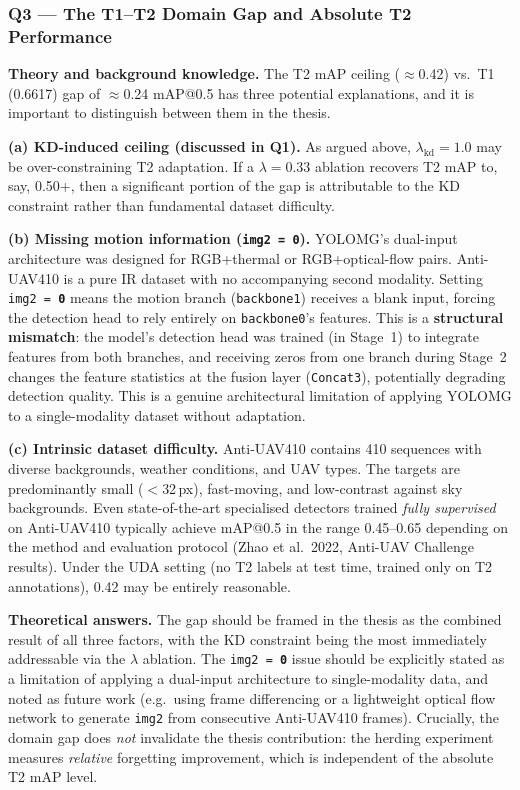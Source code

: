 \subsubsection*{Q3 — The T1--T2 Domain Gap and Absolute T2 Performance}

\textbf{Theory and background knowledge.}
The T2 mAP ceiling ($\approx$0.42) vs.\ T1 (0.6617) gap of
$\approx$0.24 mAP@0.5 has three potential explanations, and it
is important to distinguish between them in the thesis.

\textbf{(a) KD-induced ceiling (discussed in Q1).}
As argued above, $\lambda_{\text{kd}}=1.0$ may be over-constraining
T2 adaptation. If a $\lambda=0.33$ ablation recovers T2 mAP to,
say, 0.50+, then a significant portion of the gap is attributable
to the KD constraint rather than fundamental dataset difficulty.

\textbf{(b) Missing motion information (\texttt{img2\,=\,\textbf{0}}).}
YOLOMG's dual-input architecture was designed for RGB+thermal or
RGB+optical-flow pairs. Anti-UAV410 is a pure IR dataset with no
accompanying second modality. Setting \texttt{img2\,=\,\textbf{0}}
means the motion branch (\texttt{backbone1}) receives a blank input,
forcing the detection head to rely entirely on \texttt{backbone0}'s
features. This is a \textbf{structural mismatch}: the model's
detection head was trained (in Stage~1) to integrate features from
both branches, and receiving zeros from one branch during Stage~2
changes the feature statistics at the fusion layer
(\texttt{Concat3}), potentially degrading detection quality.
This is a genuine architectural limitation of applying YOLOMG to a
single-modality dataset without adaptation.

\textbf{(c) Intrinsic dataset difficulty.}
Anti-UAV410 contains 410 sequences with diverse backgrounds, weather
conditions, and UAV types. The targets are predominantly small
($<$32\,px), fast-moving, and low-contrast against sky backgrounds.
Even state-of-the-art specialised detectors trained \emph{fully
supervised} on Anti-UAV410 typically achieve mAP@0.5 in the range
0.45--0.65 depending on the method and evaluation protocol
(Zhao et al.\ 2022, Anti-UAV Challenge results). Under the UDA
setting (no T2 labels at test time, trained only on T2 annotations),
0.42 may be entirely reasonable.

\textbf{Theoretical answers.}
The gap should be framed in the thesis as the combined result of
all three factors, with the KD constraint being the most immediately
addressable via the $\lambda$ ablation. The \texttt{img2\,=\,\textbf{0}}
issue should be explicitly stated as a limitation of applying a
dual-input architecture to single-modality data, and noted as
future work (e.g.\ using frame differencing or a lightweight optical
flow network to generate \texttt{img2} from consecutive Anti-UAV410
frames). Crucially, the domain gap does \emph{not} invalidate the
thesis contribution: the herding experiment measures \emph{relative}
forgetting improvement, which is independent of the absolute T2
mAP level.

